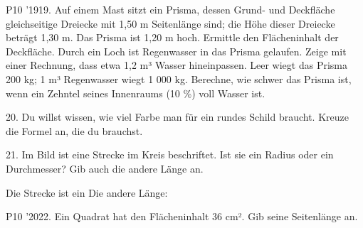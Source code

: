 \documentclass[11pt]{article}
\begin{document}
\begin{pfaufg}{P10 ’19}{19.}{}
Auf einem Mast sitzt ein Prisma, dessen Grund- und Deckfläche gleichseitige Dreiecke mit 1,50 m Seitenlänge sind; die Höhe dieser Dreiecke beträgt 1,30 m. Das Prisma ist 1,20 m hoch. Ermittle den Flächeninhalt der Deckfläche. Durch ein Loch ist Regenwasser in das Prisma gelaufen. Zeige mit einer Rechnung, dass etwa 1,2 m³ Wasser hineinpassen. Leer wiegt das Prisma 200 kg; 1 m³ Regenwasser wiegt 1 000 kg. Berechne, wie schwer das Prisma ist, wenn ein Zehntel seines Innenraums (10 \%) voll Wasser ist.
\par\smallskip\noindent {}\par
{}
\end{pfaufg}
\pfgruppe{}
\begin{pfaufg}{}{20.}{}
Du willst wissen, wie viel Farbe man für ein rundes Schild braucht. Kreuze die Formel an, die du brauchst.
\end{pfaufg}
\begin{pfaufg}{}{21.}{}
Im Bild ist eine Strecke im Kreis beschriftet. Ist sie ein Radius oder ein Durchmesser? Gib auch die andere Länge an.
\par\smallskip\noindent \begin{kreis}[2]   \end{kreis}\par
\par\noindent Die Strecke ist ein \leerfeld[.]  Die andere Länge: \leerfeld \par
{}
\end{pfaufg}
\pfgruppe{}
\begin{pfaufg}{P10 ’20}{22.}{}
Ein Quadrat hat den Flächeninhalt 36 cm². Gib seine Seitenlänge an.
\end{pfaufg}
\end{document}
